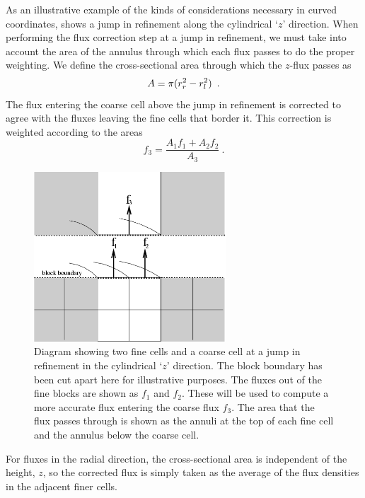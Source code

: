 As an illustrative example of the kinds of considerations
necessary in curved coordinates,
 shows a jump in refinement along the cylindrical
`$z$' direction.  When performing the flux correction step at a jump
in refinement, we must take into account the area of the annulus
through which each flux passes to do the proper weighting.  We
define the cross-sectional area through which the $z$-flux passes as
\begin{equation}
    A = \pi (r_r^2 - r_l^2)
\enskip .
\end{equation}
The flux entering the coarse cell above the
jump in refinement is corrected to agree with the fluxes leaving the
fine cells that border it.  This correction is weighted according to
the areas
\begin{equation}
   f_3 = \frac{A_1 f_1 + A_2 f_2}{A_3}~.
\end{equation}
\begin{figure}
\begin{center}
\includegraphics[height=2.5in]{Grid_flux2}
\end{center}
\caption{\label{Fig:fluxes} Diagram showing two fine cells and a
coarse cell at a jump in refinement in the cylindrical `$z$'
direction. The block boundary has been cut apart here for
illustrative purposes.  The fluxes out of the fine blocks are shown
as $f_1$ and $f_2$.  These will be used to compute a more accurate
flux entering the coarse flux $f_3$.  The area that the flux passes
through is shown as the annuli at the top of each fine cell and the
annulus below the coarse cell.}
\end{figure}

For fluxes in the radial direction, the cross-sectional area is independent
of the height, $z$, so the corrected flux is simply taken as the average of
the flux densities in the adjacent finer cells.


